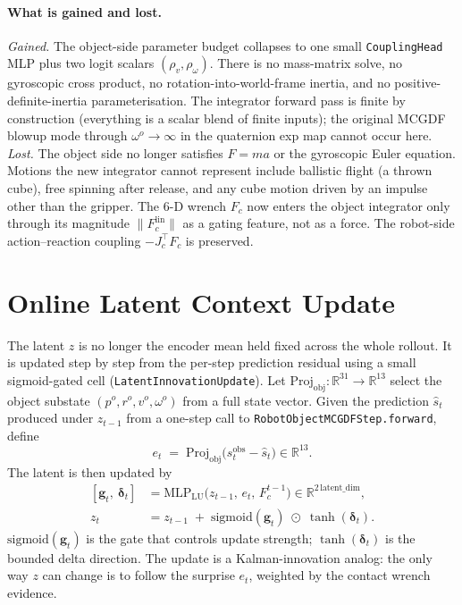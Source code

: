 \documentclass[11pt]{article}
\begin{document}
\paragraph{What is gained and lost.}
\emph{Gained.} The object-side parameter budget collapses to one small
\texttt{CouplingHead} MLP plus two logit scalars
$(\rho_v, \rho_\omega)$.  There is no mass-matrix solve, no
gyroscopic cross product, no rotation-into-world-frame inertia, and
no positive-definite-inertia parameterisation.  The integrator
forward pass is finite by construction (everything is a scalar blend
of finite inputs); the original MCGDF blowup mode through
$\omega^o \to \infty$ in the quaternion exp map cannot occur here.\\
\emph{Lost.} The object side no longer satisfies $F = m a$ or the
gyroscopic Euler equation.  Motions the new integrator cannot
represent include ballistic flight (a thrown cube), free spinning
after release, and any cube motion driven by an impulse other than
the gripper.  The 6-D wrench $F_c$ now enters the object integrator
only through its magnitude $\|F_c^{\mathrm{lin}}\|$ as a gating
feature, not as a force.  The robot-side action--reaction coupling
$-J_c^\top F_c$ is preserved.

\section{Online Latent Context Update}
\label{sec:latent-update}

The latent $z$ is no longer the encoder mean held fixed across the
whole rollout.  It is updated step by step from the per-step
prediction residual using a small sigmoid-gated cell
(\texttt{LatentInnovationUpdate}).  Let
$\mathrm{Proj}_{\mathrm{obj}}: \mathbb{R}^{31} \to \mathbb{R}^{13}$
select the object substate $(p^o, r^o, v^o, \omega^o)$ from a full
state vector.  Given the prediction $\hat s_t$ produced under
$z_{t-1}$ from a one-step call to
\texttt{RobotObjectMCGDFStep.forward}, define
\begin{equation}
  e_t \;=\; \mathrm{Proj}_{\mathrm{obj}}\!\bigl(s_t^{\mathrm{obs}} - \hat s_t\bigr) \in \mathbb{R}^{13}.
  \label{eq:noe-residual}
\end{equation}
The latent is then updated by
\begin{equation}
  \begin{aligned}
  [\boldsymbol{g}_t,\ \boldsymbol{\delta}_t] &= \mathrm{MLP}_{\mathrm{LU}}\!\bigl(z_{t-1},\,e_t,\,F_c^{t-1}\bigr) \in \mathbb{R}^{2\,\mathrm{latent\_dim}}, \\
  z_t &= z_{t-1} \;+\; \mathrm{sigmoid}(\boldsymbol{g}_t)\;\odot\;\tanh(\boldsymbol{\delta}_t).
  \end{aligned}
  \label{eq:noe-latent-update}
\end{equation}
$\mathrm{sigmoid}(\boldsymbol{g}_t)$ is the gate that controls update
strength; $\tanh(\boldsymbol{\delta}_t)$ is the bounded delta
direction.  The update is a Kalman-innovation analog: the only way
$z$ can change is to follow the surprise $e_t$, weighted by the
contact wrench evidence.
\end{document}
